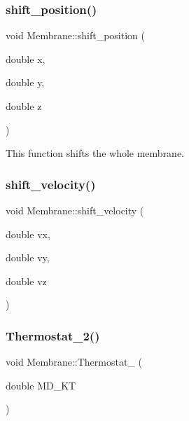 \mbox{\label{classMembrane_aae01bd33119728d0b268081bee3815e7}} 
\subsubsection{\texorpdfstring{shift\_position()}{shift\_position()}}
{\footnotesize\ttfamily void Membrane\+::shift\+\_\+position (\begin{DoxyParamCaption}\item[{double}]{x,  }\item[{double}]{y,  }\item[{double}]{z }\end{DoxyParamCaption})\hspace{0.3cm}{\ttfamily [inline]}}

This function shifts the whole membrane. \mbox{\label{classMembrane_a2fb1efa5e780590d62530cc31c8e6b07}} 
\subsubsection{\texorpdfstring{shift\_velocity()}{shift\_velocity()}}
{\footnotesize\ttfamily void Membrane\+::shift\+\_\+velocity (\begin{DoxyParamCaption}\item[{double}]{vx,  }\item[{double}]{vy,  }\item[{double}]{vz }\end{DoxyParamCaption})\hspace{0.3cm}{\ttfamily [inline]}}

\mbox{\label{classMembrane_acd87b1b9cf2c6c91a887749528c9f556}} 
\subsubsection{\texorpdfstring{Thermostat\_2()}{Thermostat\_2()}}
{\footnotesize\ttfamily void Membrane\+::\+Thermostat\+\_ (\begin{DoxyParamCaption}\item[{double}]{M\+D\+\_\+\+KT }\end{DoxyParamCaption})}

